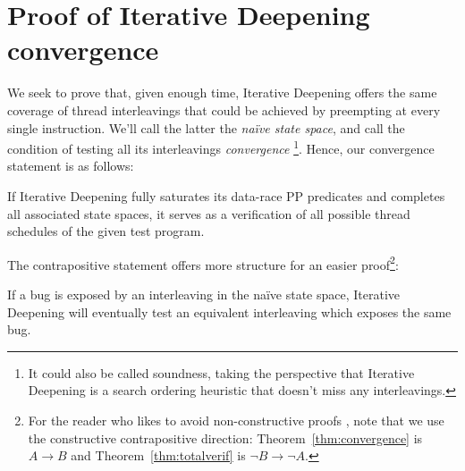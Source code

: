 \section{Proof of Iterative Deepening convergence}

\newcommand\naive{na\"{i}ve\xspace}
We seek to prove that, given enough time, Iterative Deepening offers the same coverage of thread interleavings that could be achieved by preempting at every single instruction.
We'll call the latter the {\em \naive state space}, and call the condition of testing all its interleavings {\em convergence}%
\footnote{
It could also be called soundness, taking the perspective that Iterative Deepening is a search ordering heuristic that doesn't miss any interleavings.}.
Hence, our convergence statement is as follows:

\begin{theorem}
	If Iterative Deepening fully saturates its data-race PP predicates and completes all associated state spaces,
	it serves as a verification of all possible thread schedules of the given test program.
	\label{thm:totalverif}
\end{theorem}

The contrapositive statement offers more structure for an easier proof\footnote{
For the reader who likes to avoid non-constructive proofs \cite{vargomax},
note that we use the constructive contrapositive direction:
Theorem~\ref{thm:convergence} is $A \rightarrow B$ and Theorem~\ref{thm:totalverif} is $\neg B \rightarrow \neg A$.}:

\begin{theorem}
	If a bug is exposed by an interleaving in the \naive state space, Iterative Deepening will eventually test an equivalent interleaving which exposes the same bug.
	\label{thm:convergence}
\end{theorem}

